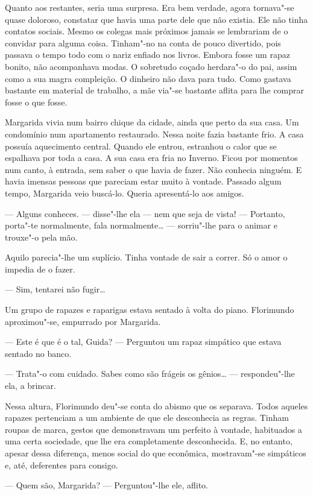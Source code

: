 Quanto aos restantes, seria uma surpresa. Era bem verdade, agora
tornava"-se quase doloroso, constatar que havia uma parte dele que não
existia. Ele não tinha contatos sociais. Mesmo os colegas mais próximos
jamais se lembrariam de o convidar para alguma coisa. Tinham"-no na conta
de pouco divertido, pois passava o tempo todo com o nariz enfiado nos
livros. Embora fosse um rapaz bonito, não acompanhava modas. O sobretudo
coçado herdara"-o do pai, assim como a sua magra compleição. O dinheiro
não dava para tudo. Como gastava bastante em material de trabalho, a mãe
via"-se bastante aflita para lhe comprar fosse o que fosse.

Margarida vivia num bairro chique da cidade, ainda que perto da sua
casa. Um condomínio num apartamento restaurado. Nessa noite fazia
bastante frio. A casa possuía aquecimento central. Quando ele entrou,
estranhou o calor que se espalhava por toda a casa. A sua casa era fria
no Inverno. Ficou por momentos num canto, à entrada, sem saber o que
havia de fazer. Não conhecia ninguém. E havia imensas pessoas que
pareciam estar muito à vontade. Passado algum tempo, Margarida veio
buscá-lo. Queria apresentá-lo aos amigos.

--- Alguns conheces. --- disse"-lhe ela --- nem que seja de vista! --- Portanto,
porta"-te normalmente, fala normalmente\ldots{} --- sorriu"-lhe para o animar e
trouxe"-o pela mão.

Aquilo parecia"-lhe um suplício. Tinha vontade de sair a correr. Só o
amor o impedia de o fazer.

--- Sim, tentarei não fugir\ldots{}

Um grupo de rapazes e raparigas estava sentado à volta do piano.
Florimundo aproximou"-se, empurrado por Margarida.

--- Este é que é o tal, Guida? --- Perguntou um rapaz simpático que estava
sentado no banco.

--- Trata"-o com cuidado. Sabes como são frágeis os gênios\ldots{} ---
respondeu"-lhe ela, a brincar.

Nessa altura, Florimundo deu"-se conta do abismo que os separava. Todos
aqueles rapazes pertenciam a um ambiente de que ele desconhecia as
regras. Tinham roupas de marca, gestos que demonstravam um perfeito
à vontade, habituados a uma certa sociedade, que lhe era completamente
desconhecida. E, no entanto, apesar dessa diferença, menos social do que
econômica, mostravam"-se simpáticos e, até, deferentes para consigo.

--- Quem são, Margarida? --- Perguntou"-lhe ele, aflito.

